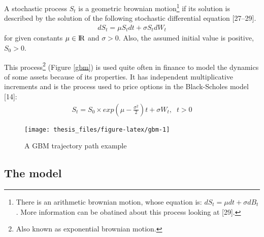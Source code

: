 \documentclass[12pt,twoside]{reedthesis}
\theoremstyle{definition}
\theoremstyle{definition}
\theoremstyle{remark}
\begin{document}
  A stochastic process \(S_t\) is a geometric brownian motion\footnote{There
    is an arithmetic brownian motion, whose equation is:
    \(dS_t = \mu dt + \sigma dB_t\). More information can be obatined
    about this process looking at {[}29{]}.} if its solution is described
  by the solution of the following stochastic differential equation
  {[}27--29{]}.
  \begin{align}
  dS_t = \mu S_t dt + \sigma S_t dW_t
  \end{align}
  \noindent
  for given constants \(\mu \in {\rm I\!R}\) and \(\sigma > 0\). Also, the
  assumed initial value is positive, \(S_0 >0\).
  
  This process\footnote{Also known as exponential brownian motion.}
  (Figure \ref{gbm}) is used quite often in finance to model the dynamics
  of some assets because of its properties. It has independent
  multiplicative increments and is the process used to price options in
  the Black-Scholes model {[}14{]}:
  \begin{align}
  S_t = S_0 \times exp{\left(\mu - \frac{\sigma^2}{2} \right) t + \sigma W_t}, \;\; t > 0
  \end{align}
  \begin{figure}
  
  {\centering \texttt{[image: thesis\_files/figure-latex/gbm-1]} 
  
  }
  
  \caption{A GBM trajectory path example \label{gbm}}\label{fig:gbm}
  \end{figure}
  \subsection{The model}\label{the-model}
  
\end{document}
